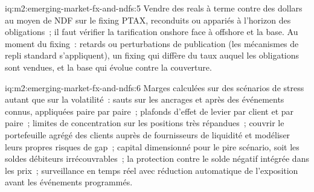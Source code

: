 \begin{solution}{iq:m2:emerging-market-fx-and-ndfs:5}
Vendre des reals à terme contre des dollars au moyen de NDF sur le fixing PTAX, reconduits ou
appariés à l'horizon des obligations~; il faut vérifier la tarification onshore face à offshore et la
base. Au moment du fixing~: retards ou perturbations de publication (les mécanismes de repli standard
s'appliquent), un fixing qui diffère du taux auquel les obligations sont vendues, et
la base qui évolue contre la couverture.
\end{solution}

\begin{solution}{iq:m2:emerging-market-fx-and-ndfs:6}
Marges calculées sur des scénarios de stress autant que sur la volatilité~: sauts sur les ancrages et après
des événements connus, appliquées paire par paire~; plafonds d'effet de levier par client et par paire~;
limites de concentration sur les positions très répandues~; couvrir le portefeuille agrégé des clients
auprès de fournisseurs de liquidité et modéliser leurs propres risques de gap~; capital dimensionné pour
le pire scénario, soit les soldes débiteurs irrécouvrables~; la protection contre le solde négatif
intégrée dans les prix~; surveillance en temps réel avec réduction automatique de l'exposition avant les
événements programmés.
\end{solution}
